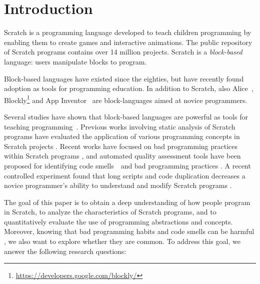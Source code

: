 \documentclass{sig-alternate}
\begin{document}



\section{Introduction}

Scratch \cite{resnick_scratch:_2009} is a programming language developed to teach children programming by enabling them to create games and interactive animations. The public repository of Scratch programs contains over 14 million projects. Scratch is a \emph{block-based} language: users manipulate blocks to program.

Block-based languages have existed since the eighties, but have recently found adoption as tools for programming education. In addition to Scratch, also Alice~\cite{conway_alice:_1994}, Blockly\footnote{\url{https://developers.google.com/blockly/}} and App Inventor~\cite{wolber_app_2011} are block-languages aimed at novice programmers.

Several studies have shown that block-based languages are powerful as tools for teaching programming~\cite{meerbaum-salant_learning_2010, b._moskal_evaluating_2005,cooper_teaching_2003,price_comparing_2015}. Previous works involving static analysis of Scratch programs have evaluated the application of various programming concepts in Scratch projects \cite{Maloney_2008,moreno_automatic_2014}. Recent works have focused on bad programming practices within Scratch programs \cite{Meerbaum_habits_2011}, and automated quality assessment tools have been proposed for identifying code smells~\cite{fowler_refactoring:_1999}~and bad programming practices \cite{boe_hairball:_2013,moreno_automatic_2014}. A recent controlled experiment found that long scripts and code duplication decreases a novice programmer's ability to understand and modify Scratch programs \cite{hermans_2016}.

The goal of this paper is to obtain a deep understanding of how people program in Scratch, to analyze the characteristics of Scratch programs, and to quantitatively evaluate the use of programming abstractions and concepts. Moreover, knowing that bad programming habits and code smells can be harmful \cite{hermans_2016}, we also want to explore whether they are common. To address this goal, we answer the following research questions:
\end{document}
